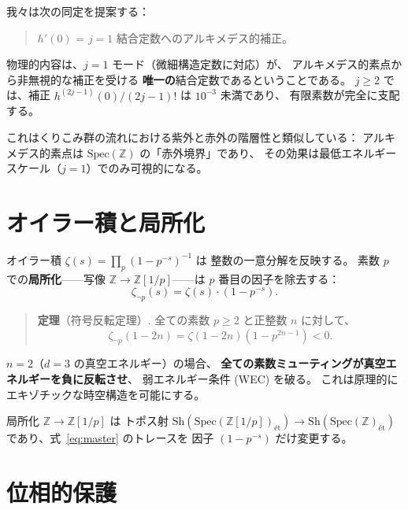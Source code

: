 \documentclass[11pt,a4paper]{article}
\newcommand{\Spec}{\mathrm{Spec}}
\newcommand{\Sh}{\mathrm{Sh}}
\begin{document}
我々は次の同定を提案する：

\begin{quote}
$h'(0)$ = $j=1$ 結合定数へのアルキメデス的補正。
\end{quote}

物理的内容は、$j=1$ モード（微細構造定数に対応）が、
アルキメデス的素点から非無視的な補正を受ける
\textbf{唯一の}結合定数であるということである。
$j\geq 2$ では、補正 $h^{(2j-1)}(0)/(2j{-}1)!$ は $10^{-3}$ 未満であり、
有限素数が完全に支配する。

これはくりこみ群の流れにおける紫外と赤外の階層性と類似している：
アルキメデス的素点は $\Spec(\mathbb{Z})$ の「赤外境界」であり、
その効果は最低エネルギースケール（$j=1$）でのみ可視的になる。

\section{オイラー積と局所化}

オイラー積 $\zeta(s)=\prod_p(1-p^{-s})^{-1}$ は
整数の一意分解を反映する。
素数 $p$ での\textbf{局所化}——写像 $\mathbb{Z}\to\mathbb{Z}[1/p]$——は
$p$ 番目の因子を除去する：
\begin{equation}
  \zeta_{\neg p}(s)=\zeta(s)\cdot(1-p^{-s}).
\end{equation}

\begin{quote}
\textbf{定理}（符号反転定理）.
全ての素数 $p\geq 2$ と正整数 $n$ に対して、
\begin{equation}
  \zeta_{\neg p}(1{-}2n)=\zeta(1{-}2n)(1-p^{2n-1})<0.
\end{equation}
\end{quote}

$n=2$（$d=3$ の真空エネルギー）の場合、
\textbf{全ての素数ミューティングが真空エネルギーを負に反転させ}、
弱エネルギー条件 (WEC) を破る。
これは原理的にエキゾチックな時空構造を可能にする。

局所化 $\mathbb{Z}\to\mathbb{Z}[1/p]$ は
トポス射
$\Sh(\Spec(\mathbb{Z}[1/p])_{\text{\'et}})
\to\Sh(\Spec(\mathbb{Z})_{\text{\'et}})$
であり、式~\eqref{eq:master} のトレースを
因子 $(1-p^{-s})$ だけ変更する。

\section{位相的保護}
\end{document}
